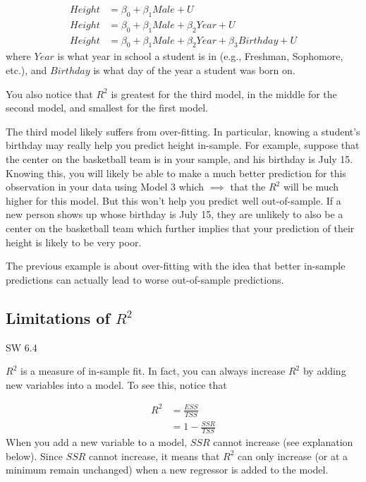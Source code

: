 \documentclass[
  letterpaper,
  DIV=11,
  numbers=noendperiod]{scrreprt}
\begin{document}
\[
  \begin{aligned}
    Height &= \beta_0 + \beta_1 Male + U \\
    Height &= \beta_0 + \beta_1 Male + \beta_2 Year + U \\
    Height &= \beta_0 + \beta_1 Male + \beta_2 Year + \beta_3 Birthday + U
  \end{aligned}
\] where \(Year\) is what year in school a student is in (e.g.,
Freshman, Sophomore, etc.), and \(Birthday\) is what day of the year a
student was born on.

You also notice that \(R^2\) is greatest for the third model, in the
middle for the second model, and smallest for the first model.

The third model likely suffers from over-fitting. In particular, knowing
a student's birthday may really help you predict height in-sample. For
example, suppose that the center on the basketball team is in your
sample, and his birthday is July 15. Knowing this, you will likely be
able to make a much better prediction for this observation in your data
using Model 3 which \(\implies\) that the \(R^2\) will be much higher
for this model. But this won't help you predict well out-of-sample. If a
new person shows up whose birthday is July 15, they are unlikely to also
be a center on the basketball team which further implies that your
prediction of their height is likely to be very poor.

The previous example is about over-fitting with the idea that better
in-sample predictions can actually lead to worse out-of-sample
predictions.

\subsection{\texorpdfstring{Limitations of
\(R^2\)}{Limitations of R\^{}2}}\label{limitations-of-r2}

SW 6.4

\(R^2\) is a measure of in-sample fit. In fact, you can always increase
\(R^2\) by adding new variables into a model. To see this, notice that

\[
  \begin{aligned}
    R^2 &= \frac{ESS}{TSS} \\
    &= 1 - \frac{SSR}{TSS}
  \end{aligned}
\] When you add a new variable to a model, \(SSR\) cannot increase (see
explanation below). Since \(SSR\) cannot increase, it means that \(R^2\)
can only increase (or at a minimum remain unchanged) when a new
regressor is added to the model.
\end{document}
